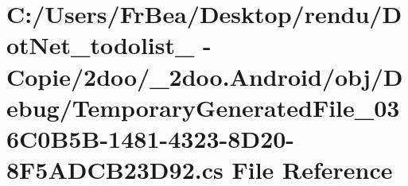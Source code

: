 \hypertarget{_android_2obj_2_debug_2_temporary_generated_file__036_c0_b5_b-1481-4323-8_d20-8_f5_a_d_c_b23_d92_8cs}{
\section{C:/Users/FrBea/Desktop/rendu/DotNet\_\-todolist\_ - Copie/2doo/\_\-2doo.Android/obj/Debug/TemporaryGeneratedFile\_\-036C0B5B-1481-4323-8D20-8F5ADCB23D92.cs File Reference}
\label{_android_2obj_2_debug_2_temporary_generated_file__036_c0_b5_b-1481-4323-8_d20-8_f5_a_d_c_b23_d92_8cs}
}
